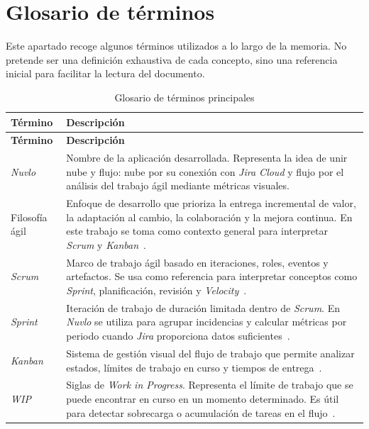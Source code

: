 \chapter*{Glosario de términos}

Este apartado recoge algunos términos utilizados a lo largo de la memoria. No pretende ser una definición exhaustiva de cada concepto, sino una referencia inicial para facilitar la lectura del documento.

{\renewcommand{\arraystretch}{1.25}\footnotesize
\begin{longtable}{p{3.2cm}p{9.2cm}}
\caption{Glosario de términos principales}\label{tab:glosario-terminos}\\
\toprule
\textbf{Término} & \textbf{Descripción} \\
\midrule
\endfirsthead
\toprule
\textbf{Término} & \textbf{Descripción} \\
\midrule
\endhead
\textit{Nuvlo} & Nombre de la aplicación desarrollada. Representa la idea de unir nube y flujo: nube por su conexión con \textit{Jira Cloud} y flujo por el análisis del trabajo ágil mediante métricas visuales. \\
Filosofía ágil & Enfoque de desarrollo que prioriza la entrega incremental de valor, la adaptación al cambio, la colaboración y la mejora continua. En este trabajo se toma como contexto general para interpretar \textit{Scrum} y \textit{Kanban}~\cite{AgileManifesto,DigitalAI2024StateOfAgile}. \\
\textit{Scrum} & Marco de trabajo ágil basado en iteraciones, roles, eventos y artefactos. Se usa como referencia para interpretar conceptos como \textit{Sprint}, planificación, revisión y \textit{Velocity}~\cite{ScrumGuide2020}. \\
\textit{Sprint} & Iteración de trabajo de duración limitada dentro de \textit{Scrum}. En \textit{Nuvlo} se utiliza para agrupar incidencias y calcular métricas por periodo cuando \textit{Jira} proporciona datos suficientes~\cite{ScrumGuide2020}. \\
\textit{Kanban} & Sistema de gestión visual del flujo de trabajo que permite analizar estados, límites de trabajo en curso y tiempos de entrega~\cite{Anderson2010Kanban}. \\
\textit{WIP} & Siglas de \textit{Work in Progress}. Representa el límite de trabajo que se puede encontrar en curso en un momento determinado. Es útil para detectar sobrecarga o acumulación de tareas en el flujo~\cite{Anderson2010Kanban}. \\

\end{longtable}}
